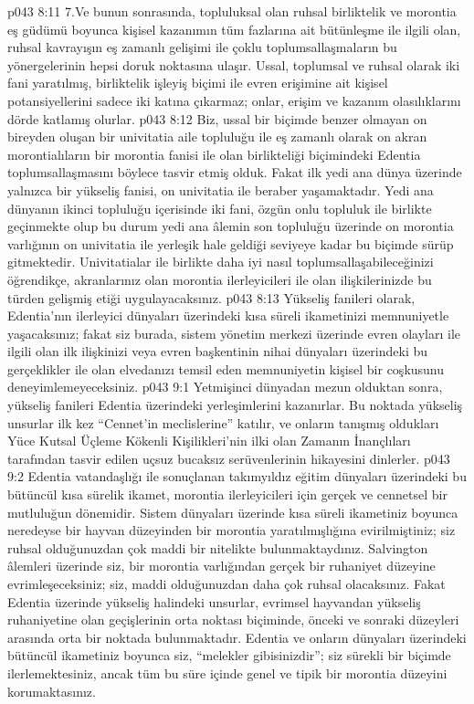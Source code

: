 \vs p043 8:11 7.\bibnobreakspace Ve bunun sonrasında, topluluksal olan ruhsal birliktelik ve morontia eş güdümü boyunca kişisel kazanımın tüm fazlarına ait bütünleşme ile ilgili olan, ruhsal kavrayışın eş zamanlı gelişimi ile çoklu toplumsallaşmaların bu yönergelerinin hepsi doruk noktasına ulaşır. Ussal, toplumsal ve ruhsal olarak iki fani yaratılmış, birliktelik işleyiş biçimi ile evren erişimine ait kişisel potansiyellerini sadece iki katına çıkarmaz; onlar, erişim ve kazanım olasılıklarını dörde katlamış olurlar.
\vs p043 8:12 Biz, ussal bir biçimde benzer olmayan on bireyden oluşan bir univitatia aile topluluğu ile eş zamanlı olarak on akran morontialıların bir morontia fanisi ile olan birlikteliği biçimindeki Edentia toplumsallaşmasını böylece tasvir etmiş olduk. Fakat ilk yedi ana dünya üzerinde yalnızca bir yükseliş fanisi, on univitatia ile beraber yaşamaktadır. Yedi ana dünyanın ikinci topluluğu içerisinde iki fani, özgün onlu topluluk ile birlikte geçinmekte olup bu durum yedi ana âlemin son topluluğu üzerinde on morontia varlığının on univitatia ile yerleşik hale geldiği seviyeye kadar bu biçimde sürüp gitmektedir. Univitatialar ile birlikte daha iyi nasıl toplumsallaşabileceğinizi öğrendikçe, akranlarınız olan morontia ilerleyicileri ile olan ilişkilerinizde bu türden gelişmiş etiği uygulayacaksınız.
\vs p043 8:13 Yükseliş fanileri olarak, Edentia’nın ilerleyici dünyaları üzerindeki kısa süreli ikametinizi memnuniyetle yaşacaksınız; fakat siz burada, sistem yönetim merkezi üzerinde evren olayları ile ilgili olan ilk ilişkinizi veya evren başkentinin nihai dünyaları üzerindeki bu gerçeklikler ile olan elvedanızı temsil eden memnuniyetin kişisel bir coşkusunu deneyimlemeyeceksiniz.
\vs p043 9:1 Yetmişinci dünyadan mezun olduktan sonra, yükseliş fanileri Edentia üzerindeki yerleşimlerini kazanırlar. Bu noktada yükseliş unsurlar ilk kez “Cennet’in meclislerine” katılır, ve onların tanışmış oldukları Yüce Kutsal Üçleme Kökenli Kişilikleri’nin ilki olan Zamanın İnançlıları tarafından tasvir edilen uçsuz bucaksız serüvenlerinin hikayesini dinlerler.
\vs p043 9:2 Edentia vatandaşlığı ile sonuçlanan takımyıldız eğitim dünyaları üzerindeki bu bütüncül kısa sürelik ikamet, morontia ilerleyicileri için gerçek ve cennetsel bir mutluluğun dönemidir. Sistem dünyaları üzerinde kısa süreli ikametiniz boyunca neredeyse bir hayvan düzeyinden bir morontia yaratılmışlığına evirilmiştiniz; siz ruhsal olduğunuzdan çok maddi bir nitelikte bulunmaktaydınız. Salvington âlemleri üzerinde siz, bir morontia varlığından gerçek bir ruhaniyet düzeyine evrimleşeceksiniz; siz, maddi olduğunuzdan daha çok ruhsal olacaksınız. Fakat Edentia üzerinde yükseliş halindeki unsurlar, evrimsel hayvandan yükseliş ruhaniyetine olan geçişlerinin orta noktası biçiminde, önceki ve sonraki düzeyleri arasında orta bir noktada bulunmaktadır. Edentia ve onların dünyaları üzerindeki bütüncül ikametiniz boyunca siz, “melekler gibisinizdir”; siz sürekli bir biçimde ilerlemektesiniz, ancak tüm bu süre içinde genel ve tipik bir morontia düzeyini korumaktasınız.
